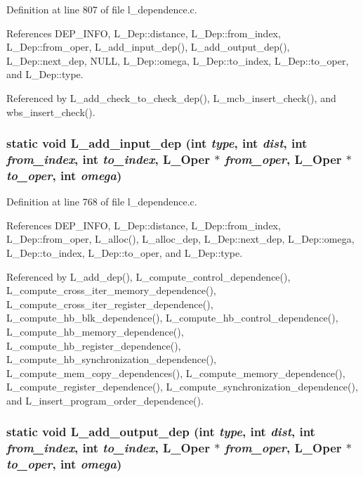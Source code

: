 Definition at line 807 of file l\_\-dependence.c.

References DEP\_\-INFO, L\_\-Dep::distance, L\_\-Dep::from\_\-index, L\_\-Dep::from\_\-oper, L\_\-add\_\-input\_\-dep(), L\_\-add\_\-output\_\-dep(), L\_\-Dep::next\_\-dep, NULL, L\_\-Dep::omega, L\_\-Dep::to\_\-index, L\_\-Dep::to\_\-oper, and L\_\-Dep::type.

Referenced by L\_\-add\_\-check\_\-to\_\-check\_\-dep(), L\_\-mcb\_\-insert\_\-check(), and wbs\_\-insert\_\-check().
\subsubsection{\setlength{\rightskip}{0pt plus 5cm}static void L\_\-add\_\-input\_\-dep (int {\em type}, int {\em dist}, int {\em from\_\-index}, int {\em to\_\-index}, L\_\-Oper $\ast$ {\em from\_\-oper}, L\_\-Oper $\ast$ {\em to\_\-oper}, int {\em omega})\hspace{0.3cm}{\tt  [static]}}\label{l__dependence_8c_5fd87f446901a7d61585eb99224c2b99}




Definition at line 768 of file l\_\-dependence.c.

References DEP\_\-INFO, L\_\-Dep::distance, L\_\-Dep::from\_\-index, L\_\-Dep::from\_\-oper, L\_\-alloc(), L\_\-alloc\_\-dep, L\_\-Dep::next\_\-dep, L\_\-Dep::omega, L\_\-Dep::to\_\-index, L\_\-Dep::to\_\-oper, and L\_\-Dep::type.

Referenced by L\_\-add\_\-dep(), L\_\-compute\_\-control\_\-dependence(), L\_\-compute\_\-cross\_\-iter\_\-memory\_\-dependence(), L\_\-compute\_\-cross\_\-iter\_\-register\_\-dependence(), L\_\-compute\_\-hb\_\-blk\_\-dependence(), L\_\-compute\_\-hb\_\-control\_\-dependence(), L\_\-compute\_\-hb\_\-memory\_\-dependence(), L\_\-compute\_\-hb\_\-register\_\-dependence(), L\_\-compute\_\-hb\_\-synchronization\_\-dependence(), L\_\-compute\_\-mem\_\-copy\_\-dependences(), L\_\-compute\_\-memory\_\-dependence(), L\_\-compute\_\-register\_\-dependence(), L\_\-compute\_\-synchronization\_\-dependence(), and L\_\-insert\_\-program\_\-order\_\-dependence().
\subsubsection{\setlength{\rightskip}{0pt plus 5cm}static void L\_\-add\_\-output\_\-dep (int {\em type}, int {\em dist}, int {\em from\_\-index}, int {\em to\_\-index}, L\_\-Oper $\ast$ {\em from\_\-oper}, L\_\-Oper $\ast$ {\em to\_\-oper}, int {\em omega})\hspace{0.3cm}{\tt  [static]}}\label{l__dependence_8c_bf35d9d70fc1843ce96406273a599371}




